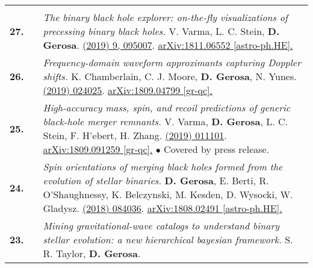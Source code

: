 {\begin{longtable}{rp{0.3cm}p{15.8cm}}
\vspace{0.09cm}\\
%
\textbf{27.} & & \textit{The binary black hole explorer: on-the-fly visualizations of precessing binary black holes.}
\newline{}
V. Varma, L. C. Stein, \textbf{D. Gerosa}.
\newline{}
\href{https://iopscience.iop.org/article/10.1088/1361-6382/ab0ee9/meta}{\cqg 36 (2019) 9, 095007}. \href{https://arxiv.org/abs/1811.06552}{arXiv:1811.06552 [astro-ph.HE].}
\vspace{0.09cm}\\
%
\textbf{26.} & & \textit{Frequency-domain waveform approximants capturing Doppler shifts.}
\newline{}
K. Chamberlain, C. J. Moore, \textbf{D. Gerosa}, N. Yunes.
\newline{}
\href{https://journals.aps.org/prd/abstract/10.1103/PhysRevD.99.024025}{\prd 99 (2019) 024025}. \href{https://arxiv.org/abs/1809.04799}{arXiv:1809.04799 [gr-qc].}
\vspace{0.09cm}\\
%
\textbf{25.} & & \textit{High-accuracy mass, spin, and recoil predictions of generic black-hole merger remnants.}
\newline{}
V. Varma, \textbf{D. Gerosa}, L. C. Stein, F. H'ebert, H. Zhang.
\newline{}
\href{https://journals.aps.org/prl/abstract/10.1103/PhysRevLett.122.011101}{\prl 122 (2019) 011101}. \href{https://arxiv.org/abs/1809.091259}{arXiv:1809.091259 [gr-qc].}
\newline{}
\textcolor{color1}{$\bullet$} Covered by press release.
\vspace{0.09cm}\\
%
\textbf{24.} & & \textit{Spin orientations of merging black holes formed from the evolution of stellar binaries.}
\newline{}
\textbf{D. Gerosa}, E. Berti, R. O'Shaughnessy, K. Belczynski, M. Kesden, D. Wysocki, W. Gladysz.
\newline{}
\href{https://journals.aps.org/prd/abstract/10.1103/PhysRevD.98.084036}{\prd 98 (2018) 084036}. \href{https://arxiv.org/abs/1808.02491}{arXiv:1808.02491 [astro-ph.HE].}
\vspace{0.09cm}\\
%
\textbf{23.} & & \textit{Mining gravitational-wave catalogs to understand binary stellar evolution: a new hierarchical bayesian framework.}
\newline{}
S. R. Taylor, \textbf{D. Gerosa}.

\end{longtable}}
